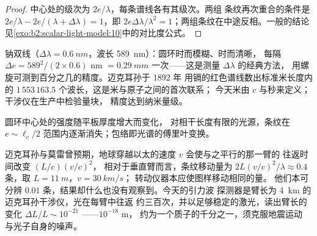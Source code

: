 \begin{proof}
中心处的级次为 $2e/\lambda$，每条谱线各有其级次。两组
条纹再次重合的条件是 $2e/\lambda - 2e/(\lambda + \Delta\lambda) = 1$，即 $2e\Delta\lambda
/\lambda^2 = 1$；两组条纹在中途反相。一般的结论
见\cref{exo:b2:scalar-light-model:10}中的对比度公式。
\end{proof}

\begin{example}[钠双线与米]\label{ex:b2:michelson:sodium}
钠双线（$\Delta\lambda = \qty{0.6}{nm}$，波长 \qty{589}{nm}）：圆环时而模糊、时而清晰，
每隔 $\Delta e = 589^2/(2 \times 0.6)$ nm $= \qty{0.29}{mm}$ 一次——这是测量 $\Delta\lambda$ 的经典方法，
用螺旋可测到百分之几的精度。迈克耳孙于 1892 年
用镉的红色谱线数出标准米长度内的
$1\,553\,163.5$ 个波长，这是米与原子之间的首次联系；
今天米由 $c$ 与秒来定义；
干涉仪在生产中检验量块，
精度达到纳米量级。
\end{example}

\begin{omfigure}

{\small 圆环中心处的强度随平板厚度增大而变化，
对相干长度有限的光源，条纹在
$e \sim \ell_c/2$ 范围内逐渐消失；包络即光谱的傅里叶变换。}
\end{omfigure}

\begin{remark}[未测到效应的臂与测到波的臂]\label{rem:b2:michelson:history}
迈克耳孙与莫雷曾预期，地球穿越以太的速度 $v$ 会使与之平行的那一臂的
往返时间改变 $(L/c)(v/c)^2$，
相对于垂直臂而言，条纹移动量为
$2L(v/c)^2/\lambda \approx 0.4$ 条，取 $L = \qty{11}{m}$，$v = \qty{30}{km/s}$；
转动仪器本应使图样移动相同的量。
他们本可分辨 $0.01$ 条，结果却什么也没有观察到。今天的引力波
探测器是臂长为 \qty{4}{km} 的迈克耳孙干涉仪，光在每臂中往返
约三百次，并以足够稳定的激光，读出臂长的
变化 $\Delta L/L \sim 10^{-21}$ ——$10^{-18}$ m，
约为一个质子的千分之一，须克服地震运动
与光子自身的噪声。
\end{remark}

